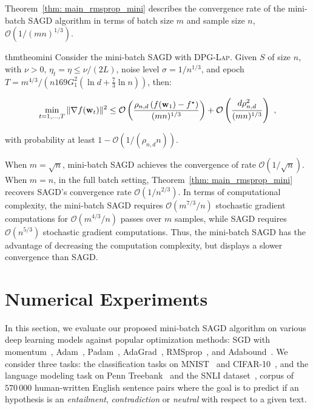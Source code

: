 \documentclass[11pt]{article}
\begin{document}
Theorem~\ref{thm: main_rmsprop_mini} 
describes the convergence rate of the mini-batch \textsc{SAGD} algorithm in terms of batch size $m$ and sample size $n$, \ie $\mathcal{O}(1/(mn)^{1/3})$.
\begin{restatable}{thm}{theomini}
\label{thm: main_rmsprop_mini}
Consider the mini-batch \textsc{SAGD} with \textsc{DPG-Lap}. 
Given $S$ of size $n$, with $\nu >0$, $\eta_t = \eta \leq \nu/(2L)$, noise level $\sigma = 1/n^{1/3}$, and epoch $T = m^{4/3}/\left(n169G_1^2(\ln d + \frac{7}{3}\ln n)\right)$, then:
 \begin{small}
\begin{equation*}
\begin{split}
 \min_{t = 1,..., T}\|\nabla f(\mathbf{w}_t)\|^2 
 \leq\mathcal{O} \left( \frac{\rho_{n,d} \left(f(\mathbf{w}_1) - f^\star \right)}{(mn)^{1/3}} \right)+\mathcal{O} \left( \frac{d \rho_{n,d}^2}{(mn)^{1/3}}\right)~,
 \end{split}
\end{equation*}
\end{small}
with probability at least $1-\mathcal{O} \left(1/(\rho_{n,d} n)\right)$.
\end{restatable}
When $m = \sqrt{n}$, mini-batch \textsc{SAGD} achieves the convergence of rate $\mathcal{O}(1/\sqrt{n})$. When $m=n$, \ie in the full batch setting, Theorem~\ref{thm: main_rmsprop_mini} recovers \textsc{SAGD}'s convergence rate  $\mathcal{O}(1/n^{2/3})$. 
In terms of computational complexity, the mini-batch \textsc{SAGD} requires $\mathcal{O}(m^{7/3}/n)$ stochastic gradient computations for $\mathcal{O}(m^{4/3}/n)$ passes over $m$ samples, while \textsc{SAGD} requires $\mathcal{O}(n^{5/3})$ stochastic gradient computations. 
Thus, the mini-batch \textsc{SAGD} has the advantage of decreasing the computation complexity, but displays a slower convergence than \textsc{SAGD}.


\section{Numerical Experiments} \label{sec: experiment}


In this section, we evaluate our proposed mini-batch \textsc{SAGD} algorithm on various deep learning models against popular optimization methods: SGD with momentum~\citep{qian1999momentum}, Adam~\citep{kiba15}, Padam~\citep{chgu2018},  AdaGrad~\citep{duha11},  RMSprop~\citep{tige12}, and Adabound~\citep{luxi2019}. 
We consider three tasks: the classification tasks on MNIST~\citep{lebo1998} and CIFAR-10~\citep{krhi2009}, and the language modeling task on Penn Treebank~\citep{mama1993} and the SNLI dataset~\citep{bowman2015large}, corpus of $570 \, 000$ human-written English sentence pairs where the goal is to predict if an hypothesis is an \emph{entailment}, \emph{contradiction} or \emph{neutral} with respect to a given text.
\end{document}
